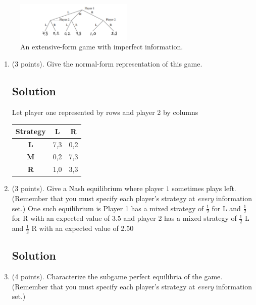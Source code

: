 \documentclass[11pt]{article}
\begin{document}
\begin{enumerate}
\begin{figure}[!ht]
\centering
\includegraphics[width=0.5\textwidth]{hw2-Figure.png}
\caption{An extensive-form game with imperfect information.}
\end{figure}

\begin{enumerate}
    \item (3 points). Give the normal-form representation of this game.
    \subsection{Solution}
    Let player one represented by rows and player 2 by columns
    \begin{center}
    \begin{tabular}{| c | c | c |}
    \hline
    \textbf{Strategy} & \textbf{L} & \textbf{R} \\ \hline \hline
    \textbf{L} &  7,3 & 0,2\\ \hline
    \textbf{M} &  0,2 &  7,3 \\ \hline
    \textbf{R} &  1,0 & 3,3  \\ \hline
    \end{tabular}
    \end{center}
    \item (3 points). Give a Nash equilibrium where player $1$ sometimes plays left. (Remember that you must specify each player's strategy at {\em every} information set.)
    One such equilibrium is Player 1 has a mixed strategy of $\frac{1}{2}$ for L and $\frac{1}{2}$  for R with an expected value of 3.5 and player 2 has a mixed strategy of $\frac{1}{2}$ L and $\frac{1}{2}$  R with an expected value of 2.50
    \subsection{Solution}
    \item (4 points). Characterize the subgame perfect equilibria of the game. (Remember that you must specify each player's strategy at {\em every} information set.)

\end{enumerate}
\end{enumerate}
\end{document}
